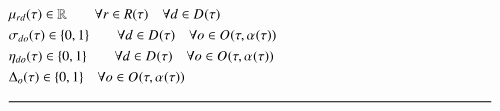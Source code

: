 {\begin{alignat}{2}
		& \VarTacticalExcess \in \mathbb{R} \quad                                                                                                                                                                                                                           \quad \forall r \in \SetResource \quad \forall \ElementDays \in \SetDays{}                                                                                                                                                                                                                 \\
		& \VarTacticalWorkBinary{\ElementDays}{\ElementOperation} \in \{0, 1\}\quad                                                                                                                                                                                         \quad \forall \ElementDays \in \SetDays{} \quad \forall \ElementOperation \in \SetOperation{}{\VarStrategicWorkOrderAssignment{}{}}                                                                                                                                                        \\
		& \VarTacticalWorkBinaryConsecutive \in \{0, 1\}\quad                                                                                                                                                                                                               \quad \forall \ElementDays \in \SetDays{} \quad \forall \ElementOperation \in \SetOperation{}{\VarStrategicWorkOrderAssignment{}{}}                                                                                                                                                        \\
		& \VarTacticalOperationDifference \in \{0, 1\}                                                                                                                                                                                                                              \quad \forall \ElementOperation \in \SetOperation{}{\VarStrategicWorkOrderAssignment{}{}}\\
		& \text{\rule{\linewidth}{0.8pt}} \notag \label{}                                                                                                                                                                                                                                                                                                                                                                      
	\end{alignat}
}
